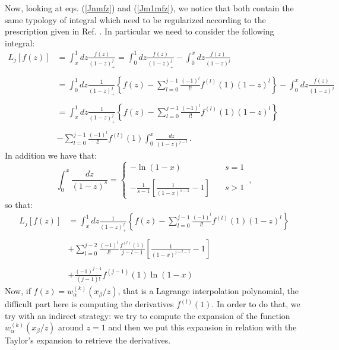\documentclass[10pt,a4paper]{article}
\begin{document}
Now, looking at eqs. (\ref{Jnmfz}) and (\ref{Jm1mfz}), we notice that
both contain the same typology of integral which need to be
regularized according to the prescription given in
Ref. \cite{Savvidy:2013gsa}. In particular we need to consider the
following integral:
\begin{equation}
\begin{array}{rl}
L_j[f(z)] &=\displaystyle \int_x^1 dz\frac{f(z)}{(1-z)_+^j} = \int_0^1
dz\frac{f(z)}{(1-z)_+^j} - \int_0^x dz\frac{f(z)}{(1-z)^j}\\
\\
& =\displaystyle \int_0^1 dz\frac{1}{(1-z)_+^j}\left\{f(z) - \sum_{l=0}^{j-1} \frac{(-1)^l}{l!}
  f^{(l)}(1) (1-z)^l
\right\} - \int_0^x dz\frac{f(z)}{(1-z)^j}\\
\\
& = \displaystyle \int_x^1 dz\frac{1}{(1-z)_+^j}\left\{f(z) - \sum_{l=0}^{j-1} \frac{(-1)^l}{l!}
  f^{(l)}(1) (1-z)^l
\right\} \\
\\
&- \displaystyle \sum_{l=0}^{j-1} \frac{(-1)^l}{l!}
  f^{(l)}(1) \int_0^x\frac{dz}{(1-z)^{j-l}}\,.
\end{array}
\end{equation}
In addition we have that:
\begin{equation}
\int_0^x\frac{dz}{(1-z)^{s}} =
\left\{
\begin{array}{ll}
- \ln(1-x) & \quad s = 1\\
\\
\displaystyle - \frac1{s-1}\left[\frac1{(1-x)^{s-1}}-1\right] & \quad s > 1
\end{array}
\right.\,,
\end{equation}
so that:
\begin{equation}\label{ciao}
\begin{array}{rl}
L_j[f(z)] & = \displaystyle \int_x^1 dz\frac{1}{(1-z)_+^j}\left\{f(z) - \sum_{l=0}^{j-1} \frac{(-1)^l}{l!}
  f^{(l)}(1) (1-z)^l
\right\} \\
\\
& + \displaystyle \sum_{l=0}^{j-2} \frac{(-1)^l}{l!}
  \frac{f^{(l)}(1)}{j-l-1}\left[\frac1{(1-x)^{j-l-1}}-1\right]\\
\\
& + \displaystyle \frac{(-1)^{j-1}}{(j-1)!}f^{(j-1)}(1)\ln(1-x)
\end{array}
\end{equation}
Now, if $f(z)=w_{\alpha}^{(k)}(x_\beta/z)$, that is a Lagrange
interpolation polynomial, the difficult part here is
computing the derivatives $f^{(l)}(1)$. In order to do that, we try
with an indirect strategy: we try to compute the expansion of the
function $w_{\alpha}^{(k)}(x_\beta/z)$ around $z=1$ and then we put
this expansion in relation with the Taylor's expansion to retrieve the
derivatives.
\end{document}
